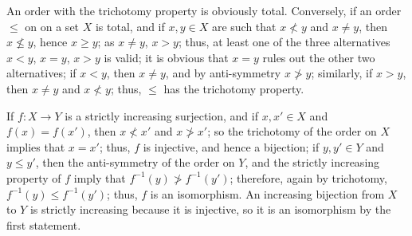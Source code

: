 \documentclass{article}
\begin{document}
\begin{solution}[\ref{exe:4knqif5b}]
  \label{sol:ien6orgc}
  An order with the trichotomy property is obviously total.
  Conversely, if an order \(\leq\) on on a set \(X\) is total, and if
  \(x,y \in X\) are such that \(x \nless y\) and \(x \neq y\), then
  \(x \nleq y\), hence \(x \geq y\); as \(x \neq y\), \(x > y\); thus,
  at least one of the three alternatives \(x < y\), \(x = y\),
  \(x > y\) is valid; it is obvious that \(x = y\) rules out the other
  two alternatives; if \(x < y\), then \(x \neq y\), and by
  anti-symmetry \(x \ngtr y\); similarly, if \(x > y\), then
  \(x \neq y\) and \(x \nless y\); thus, \(\leq\) has the trichotomy
  property.
\end{solution}

\begin{solution}[\ref{exe:v1tw1ijd}]
  \label{sol:rd6deawb}
  If \(f : X \to Y\) is a strictly increasing surjection, and if
  \(x, x' \in X\) and \(f(x) = f(x')\), then \(x \nless x'\) and
  \(x \ngtr x'\); so the trichotomy of the order on \(X\) implies that
  \(x = x'\); thus, \(f\) is injective, and hence a bijection; if
  \(y, y' \in Y\) and \(y \leq y'\), then the anti-symmetry of the
  order on \(Y\), and the strictly increasing property of \(f\) imply
  that \(f^{-1}(y) \ngtr f^{-1}(y')\); therefore, again by trichotomy,
  \(f^{-1}(y) \leq f^{-1}(y')\); thus, \(f\) is an isomorphism.  An
  increasing bijection from \(X\) to \(Y\) is strictly increasing
  because it is injective, so it is an isomorphism by the first
  statement.
\end{solution}
\end{document}
